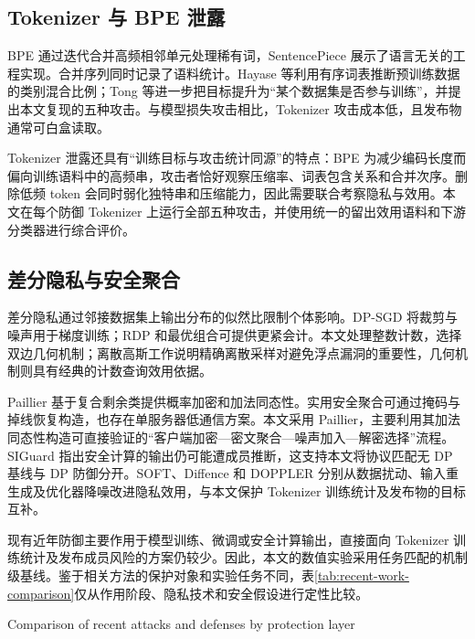 \subsection{Tokenizer 与 BPE 泄露}

BPE 通过迭代合并高频相邻单元处理稀有词\cite{sennrich2016bpe}，SentencePiece 展示了语言无关的工程实现\cite{kudo2018sentencepiece}。合并序列同时记录了语料统计。Hayase 等利用有序词表推断预训练数据的类别混合比例\cite{hayase2024mixture}；Tong 等进一步把目标提升为“某个数据集是否参与训练”，并提出本文复现的五种攻击\cite{tong2026tokenizermia}。与模型损失攻击相比，Tokenizer 攻击成本低，且发布物通常可白盒读取。

Tokenizer 泄露还具有“训练目标与攻击统计同源”的特点：BPE 为减少编码长度而偏向训练语料中的高频串，攻击者恰好观察压缩率、词表包含关系和合并次序。删除低频 token 会同时弱化独特串和压缩能力，因此需要联合考察隐私与效用。本文在每个防御 Tokenizer 上运行全部五种攻击，并使用统一的留出效用语料和下游分类器进行综合评价。

\subsection{差分隐私与安全聚合}

差分隐私通过邻接数据集上输出分布的似然比限制个体影响\cite{dwork2006calibrating,dwork2014foundations}。DP-SGD 将裁剪与噪声用于梯度训练\cite{abadi2016dpsgd}；RDP 和最优组合可提供更紧会计\cite{mironov2017rdp,kairouz2015composition}。本文处理整数计数，选择双边几何机制；离散高斯工作说明精确离散采样对避免浮点漏洞的重要性\cite{canonne2020discrete}，几何机制则具有经典的计数查询效用依据\cite{ghosh2009geometric}。

Paillier 基于复合剩余类提供概率加密和加法同态性\cite{paillier1999}。实用安全聚合可通过掩码与掉线恢复构造\cite{bonawitz2017secureagg}，也存在单服务器低通信方案\cite{bell2020secureagg}。本文采用 Paillier，主要利用其加法同态性构造可直接验证的“客户端加密—密文聚合—噪声加入—解密选择”流程。SIGuard 指出安全计算的输出仍可能遭成员推断\cite{wang2025siguard}，这支持本文将协议匹配无 DP 基线与 DP 防御分开。SOFT、Diffence 和 DOPPLER 分别从数据扰动、输入重生成及优化器降噪改进隐私效用\cite{zhang2025soft,peng2025diffence,zhang2024doppler}，与本文保护 Tokenizer 训练统计及发布物的目标互补。

现有近年防御主要作用于模型训练、微调或安全计算输出，直接面向 Tokenizer 训练统计及发布成员风险的方案仍较少。因此，本文的数值实验采用任务匹配的机制级基线。鉴于相关方法的保护对象和实验任务不同，表\ref{tab:recent-work-comparison}仅从作用阶段、隐私技术和安全假设进行定性比较。

\begin{table}[t]
\centering
\caption{近三年相关攻击与防御的作用层次比较}{Comparison of recent attacks and defenses by protection layer}
\label{tab:recent-work-comparison}

\end{table}
